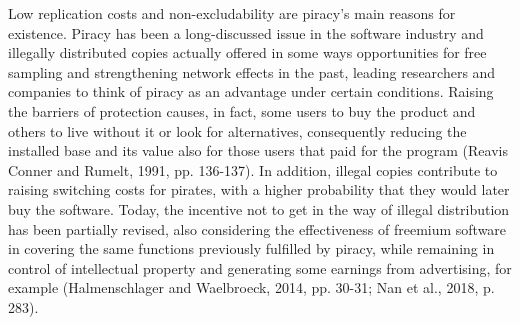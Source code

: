 Low replication costs and non-excludability are piracy's main reasons for existence. Piracy has been a long-discussed issue in the software industry and illegally distributed copies actually offered in some ways opportunities for free sampling and strengthening network effects in the past, leading researchers and companies to think of piracy as an advantage under certain conditions. Raising the barriers of protection causes, in fact, some users to buy the product and others to live without it or look for alternatives, consequently reducing the installed base and its value also for those users that paid for the program (Reavis Conner and  Rumelt, 1991, pp. 136-137). In addition, illegal copies contribute to raising switching costs for pirates, with a higher probability that they would later buy the software. Today, the incentive not to get in the way of illegal distribution has been partially revised, also considering the effectiveness of freemium software in covering the same functions previously fulfilled by piracy, while remaining in control of intellectual property and generating some earnings from advertising, for example (Halmenschlager and Waelbroeck, 2014, pp. 30-31; Nan et al., 2018, p. 283).

